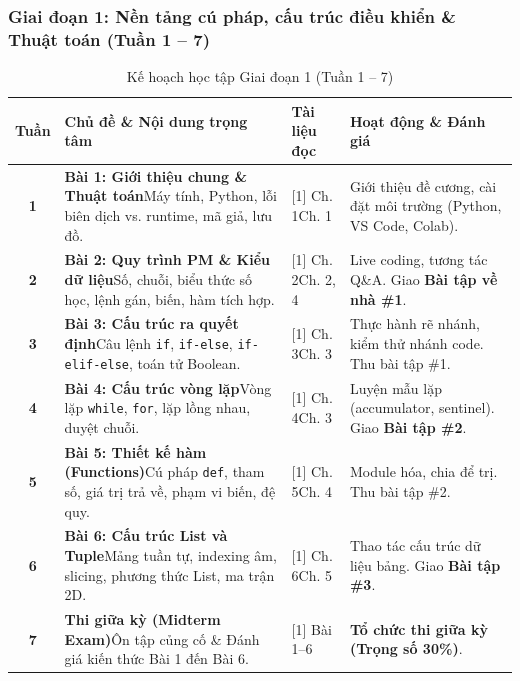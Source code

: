 \documentclass[11pt,a4paper]{article}
\begin{document}
\subsubsection*{Giai đoạn 1: Nền tảng cú pháp, cấu trúc điều khiển \& Thuật toán (Tuần 1 -- 7)}
\begin{table}[htbp]
\centering
\footnotesize
\begin{tabularx}{\textwidth}{@{}c p{5.5cm} p{2.8cm} X@{}}
\toprule
\textbf{Tuần} & \textbf{Chủ đề \& Nội dung trọng tâm} & \textbf{Tài liệu đọc} & \textbf{Hoạt động \& Đánh giá} \\
\midrule
\textbf{1} & \textbf{Bài 1: Giới thiệu chung \& Thuật toán}\newline Máy tính, Python, lỗi biên dịch vs. runtime, mã giả, lưu đồ. & [1] Ch. 1\newline [2] Ch. 1 & Giới thiệu đề cương, cài đặt môi trường (Python, VS Code, Colab). \\
\midrule
\textbf{2} & \textbf{Bài 2: Quy trình PM \& Kiểu dữ liệu}\newline Số, chuỗi, biểu thức số học, lệnh gán, biến, hàm tích hợp. & [1] Ch. 2\newline [2] Ch. 2, 4 & Live coding, tương tác Q\&A. Giao \textbf{Bài tập về nhà \#1}. \\
\midrule
\textbf{3} & \textbf{Bài 3: Cấu trúc ra quyết định}\newline Câu lệnh \texttt{if}, \texttt{if-else}, \texttt{if-elif-else}, toán tử Boolean. & [1] Ch. 3\newline [2] Ch. 3 & Thực hành rẽ nhánh, kiểm thử nhánh code. Thu bài tập \#1. \\
\midrule
\textbf{4} & \textbf{Bài 4: Cấu trúc vòng lặp}\newline Vòng lặp \texttt{while}, \texttt{for}, lặp lồng nhau, duyệt chuỗi. & [1] Ch. 4\newline [2] Ch. 3 & Luyện mẫu lặp (accumulator, sentinel). Giao \textbf{Bài tập \#2}. \\
\midrule
\textbf{5} & \textbf{Bài 5: Thiết kế hàm (Functions)}\newline Cú pháp \texttt{def}, tham số, giá trị trả về, phạm vi biến, đệ quy. & [1] Ch. 5\newline [2] Ch. 4 & Module hóa, chia để trị. Thu bài tập \#2. \\
\midrule
\textbf{6} & \textbf{Bài 6: Cấu trúc List và Tuple}\newline Mảng tuần tự, indexing âm, slicing, phương thức List, ma trận 2D. & [1] Ch. 6\newline [2] Ch. 5 & Thao tác cấu trúc dữ liệu bảng. Giao \textbf{Bài tập \#3}. \\
\midrule
\textbf{7} & \textbf{Thi giữa kỳ (Midterm Exam)}\newline Ôn tập củng cố \& Đánh giá kiến thức Bài 1 đến Bài 6. & [1] Bài 1--6 & \textbf{Tổ chức thi giữa kỳ (Trọng số 30\%)}. \\
\bottomrule
\end{tabularx}
\caption{Kế hoạch học tập Giai đoạn 1 (Tuần 1 -- 7)}
\end{table}
\end{document}
